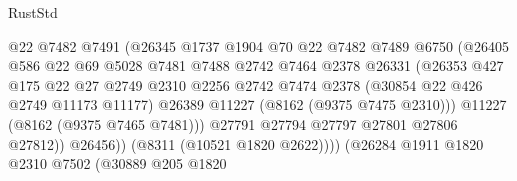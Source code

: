 \begin{lexlean}{RustStd}
\begin{coremodule}
                                      @22
                                      @7482
                                      @7491
                                      (@26345
                                        @1737
                                        @1904
                                        @70
                                        @22
                                        @7482
                                        @7489
                                        @6750
                                        (@26405
                                          @586
                                          @22
                                          @69
                                          @5028
                                          @7481
                                          @7488
                                          @2742
                                          @7464
                                          @2378
                                          @26331
                                          (@26353
                                            @427
                                            @175
                                            @22
                                            @27
                                            @2749
                                            @2310
                                            @2256
                                            @2742
                                            @7474
                                            @2378
                                            (@30854 @22 @426 @2749 @11173 @11177)
                                            @26389
                                            @11227
                                            (@8162 (@9375 @7475 @2310)))
                                          @11227
                                          (@8162 (@9375 @7465 @7481)))
                                        @27791
                                        @27794
                                        @27797
                                        @27801
                                        @27806
                                        @27812))
                                    @26456))
                                (@8311 (@10521 @1820 @2622))))
                            (@26284
                              @1911
                              @1820
                              @2310
                              @7502
                              (@30889
                                @205
                                @1820

\end{coremodule}
\end{lexlean}
